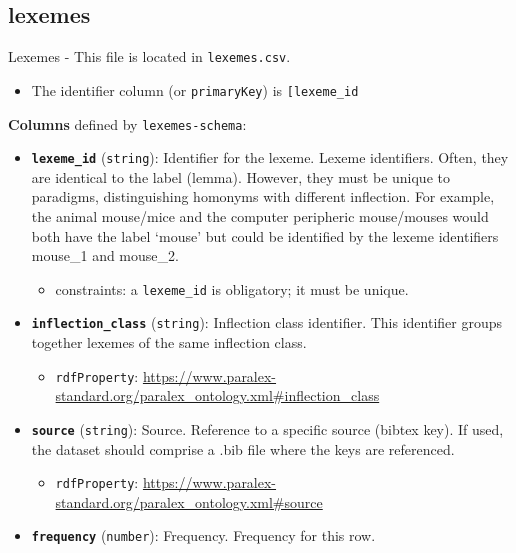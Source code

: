 \hypertarget{lexemes}{%
\subsection{\texorpdfstring{\textbf{lexemes}}{lexemes}}\label{lexemes}}

Lexemes - This file is located in \texttt{lexemes.csv}.

\begin{itemize}
\tightlist
\item
  The identifier column (or \texttt{primaryKey}) is
  \texttt{{[}\textquotesingle{}lexeme\_id\textquotesingle{}{]}}
\end{itemize}

\textbf{Columns} defined by \texttt{lexemes-schema}:

\begin{itemize}
\item
  \textbf{\texttt{lexeme\_id}} (\texttt{string}): Identifier for the
  lexeme. Lexeme identifiers. Often, they are identical to the label
  (lemma). However, they must be unique to paradigms, distinguishing
  homonyms with different inflection. For example, the animal mouse/mice
  and the computer peripheric mouse/mouses would both have the label
  `mouse' but could be identified by the lexeme identifiers mouse\_1 and
  mouse\_2.

  \begin{itemize}
  \tightlist
  \item
    constraints: a \texttt{lexeme\_id} is obligatory; it must be unique.
  \end{itemize}
\item
  \textbf{\texttt{inflection\_class}} (\texttt{string}): Inflection
  class identifier. This identifier groups together lexemes of the same
  inflection class.

  \begin{itemize}
  \tightlist
  \item
    \texttt{rdfProperty}:
    \url{https://www.paralex-standard.org/paralex_ontology.xml\#inflection_class}
  \end{itemize}
\item
  \textbf{\texttt{source}} (\texttt{string}): Source. Reference to a
  specific source (bibtex key). If used, the dataset should comprise a
  .bib file where the keys are referenced.

  \begin{itemize}
  \tightlist
  \item
    \texttt{rdfProperty}:
    \url{https://www.paralex-standard.org/paralex_ontology.xml\#source}
  \end{itemize}
\item
  \textbf{\texttt{frequency}} (\texttt{number}): Frequency. Frequency
  for this row.


\end{itemize}
